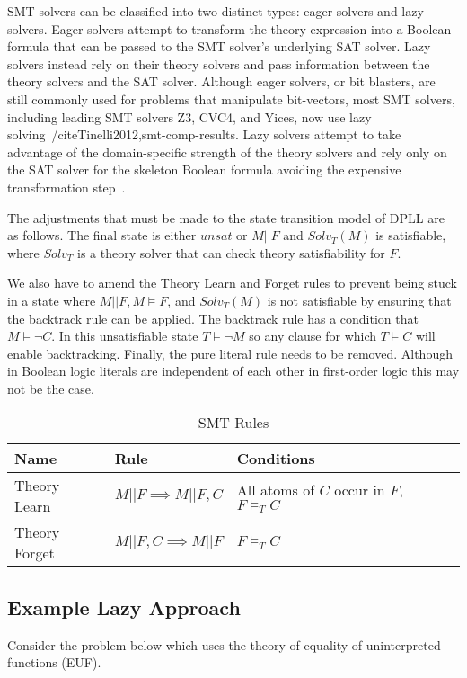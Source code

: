 \documentclass[]{final_report}
\begin{document}
SMT solvers can be classified into two distinct types: eager solvers and lazy solvers. Eager solvers attempt to transform the theory expression into a Boolean formula that can be passed to the SMT solver's underlying SAT solver. Lazy solvers instead rely on their theory solvers and pass information between the theory solvers and the SAT solver. Although eager solvers, or bit blasters, are still commonly used for problems that manipulate bit-vectors, most SMT solvers, including leading SMT solvers Z3, CVC4, and Yices, now use lazy solving~/cite{Tinelli2012,smt-comp-results}. Lazy solvers attempt to take advantage of the domain-specific strength of the theory solvers and rely only on the SAT solver for the skeleton Boolean formula avoiding the expensive transformation step~\cite{sattosmt, smtdpplt}.

The adjustments that must be made to the state transition model of DPLL are as follows. The final state is either $unsat$ or $M || F$ and $Solv _T(M)$ is satisfiable, where $Solv_T$ is a theory solver that can check theory satisfiability for $F$.

We also have to amend the Theory Learn and Forget rules to prevent being stuck in a state where $M || F, M \models F$, and $Solv_T(M)$ is not satisfiable by ensuring that the backtrack rule can be applied. The backtrack rule has a condition that $M \models \lnot C$. In this unsatisfiable state $T \models \lnot{M}$ so any clause for which $T \models C$ will enable backtracking. Finally, the pure literal rule needs to be removed. Although in Boolean logic literals are independent of each other in first-order logic this may not be the case.

\begin{table}[t]
\centering
\label{smt-rulesl}
\begin{tabular}{|p{2cm}|p{3cm}|p{6cm}|p{9cm}|}
\hline
Name & Rule & Conditions \\ \hline
Theory Learn & $M || F \implies M|| F, C $ & All atoms of $C$ occur in $F$, $F \models _T C $ \\ \hline
Theory Forget & $M || F, C \implies M || F $ & $F \models _T C$ \\ \hline
\end{tabular}
\caption{SMT Rules}
\end{table}

\subsection{Example Lazy Approach}
Consider the problem below which uses the theory of equality of uninterpreted functions (EUF).
\end{document}
